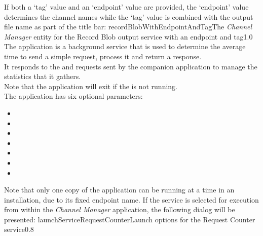 If both a `tag' value and an `endpoint' value are provided, the `endpoint' value
determines the channel names while the `tag' value is combined with the output file name
as part of the title bar:
%
{recordBlobWithEndpointAndTag}{The \emph{Channel Manager} entity for the Record Blob
output service with an endpoint and tag}{1.0}
\condPage
{}
The  application is a background service that is
used to determine the average time to send a simple request, process it and return a
response.\\

It responds to the  and
 requests sent by the
companion application  to manage the statistics
that it gathers.\\

Note that the application will exit if the
 is not running.\\

The application has six optional parameters:
\begin{itemize}
\item{}
\item\exSp{}
\item\exSp{}
\item\exSp{}
\item\exSp{}
\item\exSp{}
\item\exSp{}
\end{itemize}
Note that only one copy of the  application can be
running at a time in an \mplusm{} installation, due to its fixed endpoint name.
\condPage
If the service is selected for execution from within the \emph{Channel Manager}
application, the following dialog will be presented:
%
{launchServiceRequestCounter}{Launch options for the Request Counter service}{0.8}

